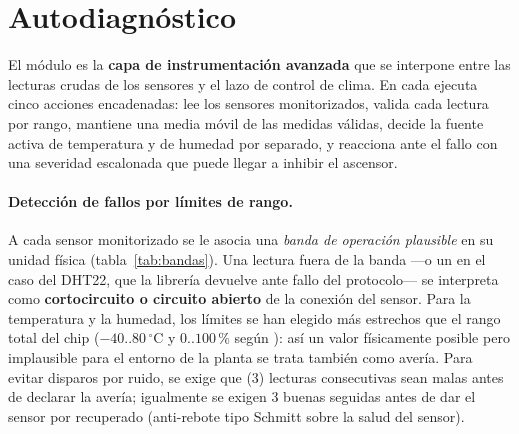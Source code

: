 \section{Autodiagnóstico}
\label{sec:autodiag}

El módulo  es la \textbf{capa de instrumentación
avanzada} que se interpone entre las lecturas crudas de los sensores y el
lazo de control de clima. En cada  ejecuta cinco
acciones encadenadas: lee los sensores monitorizados, valida cada lectura por
rango, mantiene una media móvil de las medidas válidas, decide la fuente
activa de temperatura y de humedad por separado, y reacciona ante el fallo
con una severidad escalonada que puede llegar a inhibir el ascensor.

\paragraph{Detección de fallos por límites de rango.}
\label{sub:rango}

A cada sensor monitorizado se le asocia una \emph{banda de operación
plausible} en su unidad física (tabla~\ref{tab:bandas}). Una lectura fuera
de la banda ---o un  en el caso del DHT22, que la librería
devuelve ante fallo del protocolo--- se interpreta como
\textbf{cortocircuito o circuito abierto} de la conexión del sensor. Para
la temperatura y la humedad, los límites se han elegido más estrechos que
el rango total del chip ($-40$..$80\,^{\circ}$C y $0$..$100$\,\% según
\cite{aosong_dht22}): así un valor físicamente posible pero implausible
para el entorno de la planta se trata también como avería. Para evitar disparos por ruido, se exige que
 (3) lecturas consecutivas sean malas antes de
declarar la avería; igualmente se exigen 3 buenas seguidas antes de dar el
sensor por recuperado (anti-rebote tipo Schmitt sobre la salud del sensor).

